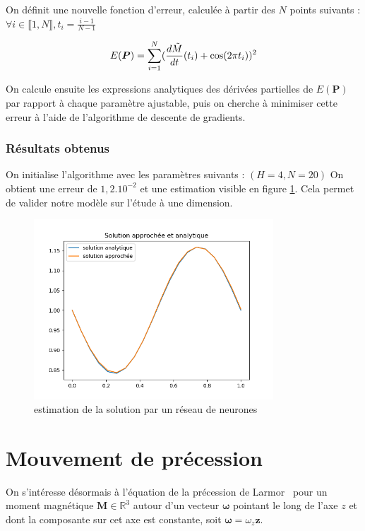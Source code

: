 \documentclass[12pt]{report}
\begin{document}
On définit une nouvelle fonction d'erreur, calculée à partir des $N$ points suivants : $\forall i \in\llbracket 1,N \rrbracket, t_i = \frac{i-1}{N-1} $ 

\begin{equation}
        E(\bm{P}) = \sum_{i=1}^{N} (\frac{d\Tilde{M}}{dt}(t_i) + \cos(2\pi t_i))^2
\label{eq:erreur NN}
\end{equation}


On calcule ensuite les expressions analytiques des dérivées partielles de $E(\bm{P})$ par rapport à chaque paramètre ajustable, puis on cherche à minimiser cette erreur à l'aide de l'algorithme de descente de gradients.

\subsection{Résultats obtenus}
On initialise l'algorithme avec les paramètres suivants : $(H=4, N=20)$
On obtient une erreur de $1,2.10^{-2}$ et une estimation visible en figure \ref{fig:resultat_NN}. Cela permet de valider notre modèle sur l'étude à une dimension.

\begin{figure}
\centering
\includegraphics[width=0.8\textwidth]{resultat_NN.png}
\caption{\label{fig:resultat_NN}estimation de la solution par un réseau de neurones}
\end{figure}

\chapter{Mouvement de précession}
\label{chap:precession}
On s'intéresse désormais à l'équation de la précession de Larmor~\cite{PrecessionLarmor} pour un moment magnétique $\bm{M} \in \mathbb{R}^3$ autour d'un vecteur ${\bm{\omega}}$ pointant le long de l'axe $z$ et dont la composante sur cet axe est constante, soit $\bm{\omega}=\omega_z{\bm z}$.
\end{document}
